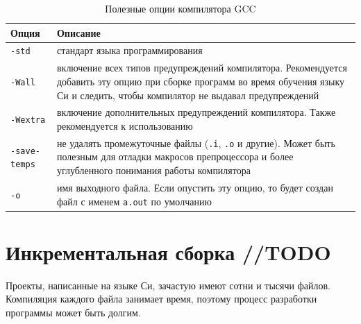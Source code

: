 \documentclass[myc.tex]{subfiles}
\begin{document}
\begin{table}[t]
\caption{Полезные опции компилятора GCC\label{tab:table1}}
\begin{small}
\begin{tabularx}{\textwidth}{|l|X|}
\hline
\textbf{Опция} & \textbf{Описание}\\
\hline
\texttt{-std} & стандарт языка программирования\\
\hline
\texttt{-Wall} & включение всех типов предупреждений компилятора. Рекомендуется добавить эту опцию при сборке программ во время обучения языку Си и следить, чтобы компилятор не выдавал предупреждений\\
\hline
\texttt{-Wextra} & включение дополнительных предупреждений компилятора. Также рекомендуется к использованию\\
\hline
\texttt{-save-temps} & не удалять промежуточные файлы (\texttt{.i}, \texttt{.o} и другие). Может быть полезным для отладки макросов препроцессора и более углубленного понимания работы компилятора\\
\hline
\texttt{-o} & имя выходного файла.  Если опустить эту опцию, то будет создан файл с именем \texttt{а.out} по умолчанию\\
\hline
\end{tabularx}
\end{small}
\end{table}



















\newpage %
\section{Инкрементальная сборка //TODO}
Проекты, написанные на языке Си, зачастую имеют сотни и тысячи файлов. Компиляция каждого файла занимает время, поэтому процесс разработки программы может быть долгим.
\end{document}
